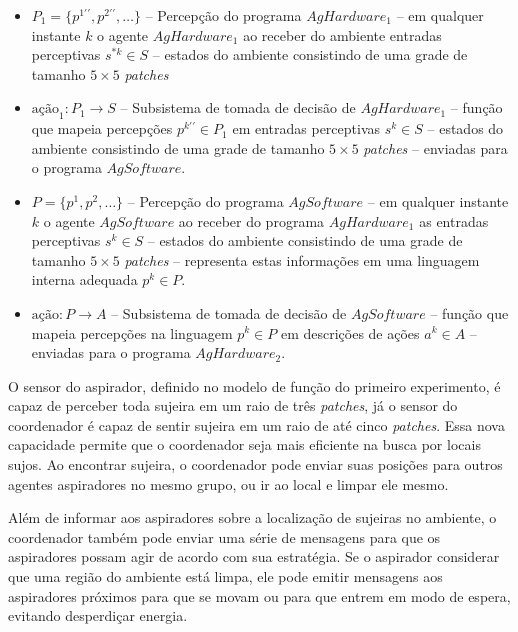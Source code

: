 \begin{itemize}
    \item $P_1 = \{p^{1\prime\prime}, p^{2\prime\prime}, \ldots\}$ -- Percepção do programa $AgHardware_1$ – em qualquer instante $k$ o agente  $AgHardware_1$ ao receber do ambiente entradas perceptivas $s^{*k} \in S$ – estados do ambiente consistindo de uma grade de tamanho $5\times5$ \textit{patches}
    
    \item $\textrm{ação}_1: P_1 \rightarrow S$ -- Subsistema de tomada de decisão de $AgHardware_1$ – função que mapeia percepções $p^{k\prime\prime} \in P_1$ em entradas perceptivas $s^k \in S$ – estados do ambiente consistindo de uma grade de tamanho $5\times5$ \textit{patches} – enviadas para o programa $AgSoftware$.
    
    \item $P = \{p^1, p^2, \ldots\}$ -- Percepção do programa $AgSoftware$ – em qualquer instante $k$ o agente $AgSoftware$ ao receber do programa $AgHardware_1$ as entradas perceptivas $s^k \in S$ – estados do ambiente consistindo de uma grade de tamanho $5\times5$ \textit{patches} – representa estas informações em uma linguagem interna adequada $p^k \in P$.
    
    \item $\textrm{ação}: P \rightarrow A$	-- Subsistema de tomada de decisão de $AgSoftware$ – função que mapeia percepções na linguagem $p^k \in P$ em descrições de ações $a^k \in A$ – enviadas para o programa $AgHardware_2$.
    
\end{itemize}

O sensor do aspirador, definido no modelo de função do primeiro experimento, é capaz de perceber toda sujeira em um raio de três \textit{patches}, já o sensor do coordenador é capaz de sentir sujeira em um raio de até cinco \textit{patches}. Essa nova capacidade permite que o coordenador seja mais eficiente na busca por locais sujos. Ao encontrar sujeira, o coordenador pode enviar suas posições para outros agentes aspiradores no mesmo grupo, ou ir ao local e limpar ele mesmo. 

Além de informar aos aspiradores sobre a localização de sujeiras no ambiente, o coordenador também pode enviar uma série de mensagens para que os aspiradores possam agir de acordo com sua estratégia. Se o aspirador considerar que uma região do ambiente está limpa, ele pode emitir mensagens aos aspiradores próximos para que se movam ou para que entrem em modo de espera, evitando desperdiçar energia. 

